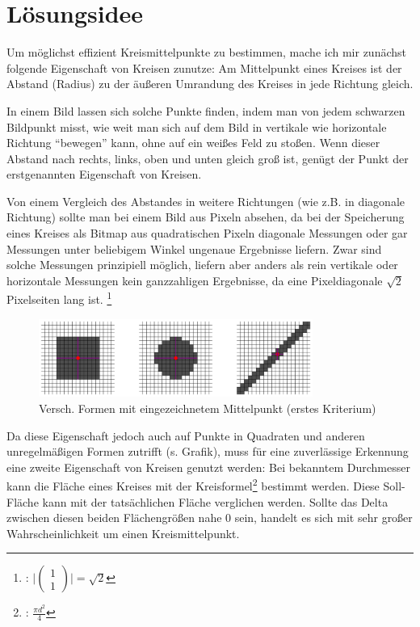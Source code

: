 \section{Lösungsidee}
Um möglichst effizient Kreismittelpunkte zu bestimmen, mache ich mir zunächst folgende Eigenschaft von Kreisen zunutze: Am Mittelpunkt eines Kreises ist der Abstand (Radius) zu der äußeren Umrandung des Kreises in jede Richtung gleich.

In einem Bild lassen sich solche Punkte finden, indem man von jedem schwarzen Bildpunkt misst, wie weit man sich auf dem Bild in vertikale wie horizontale Richtung "`bewegen"' kann, ohne auf ein weißes Feld zu stoßen. Wenn dieser Abstand nach rechts, links, oben und unten gleich groß ist, genügt der Punkt der erstgenannten Eigenschaft von Kreisen. 

Von einem Vergleich des Abstandes in weitere Richtungen (wie z.B. in diagonale Richtung) sollte man bei einem Bild aus Pixeln absehen, da bei der Speicherung eines Kreises als Bitmap aus quadratischen Pixeln diagonale Messungen oder gar Messungen unter beliebigem Winkel ungenaue Ergebnisse liefern. Zwar sind solche Messungen prinzipiell möglich, liefern aber anders als rein vertikale oder horizontale Messungen kein ganzzahligen Ergebnisse, da eine Pixeldiagonale \(\sqrt{2}\) Pixelseiten lang ist.
\footnote{: \( \vert \begin{pmatrix}1\\1\end{pmatrix} \vert = \sqrt{2}\)}

\begin{figure}[!ht]
	\centering	
	\includegraphics[width=0.8\textwidth]{durchmesservergleich}
	\caption{Versch. Formen mit eingezeichnetem Mittelpunkt (erstes Kriterium)}
\end{figure}

Da diese Eigenschaft jedoch auch auf Punkte in Quadraten und anderen unregelmäßigen Formen zutrifft (s. Grafik), muss für eine zuverlässige Erkennung eine zweite Eigenschaft von Kreisen genutzt werden: Bei bekanntem Durchmesser kann die Fläche eines Kreises mit der Kreisformel\footnote{: \(\frac{\pi d^2}{4}\)} bestimmt werden. Diese Soll-Fläche kann mit der tatsächlichen Fläche verglichen werden. Sollte das Delta zwischen diesen beiden Flächengrößen nahe 0 sein, handelt es sich mit sehr großer Wahrscheinlichkeit um einen Kreismittelpunkt.


